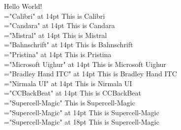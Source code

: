 \documentclass[UTF8]{article}
\begin{document}
Hello World!\\
\font\rm="Calibri" at 14pt \rm This is Calibri\\
\font\rm="Candara" at 14pt \rm This is Candara\\
\font\rm="Mistral" at 14pt \rm This is Mistral\\
\font\rm="Bahnschrift" at 14pt \rm This is Bahnschrift\\
\font\rm="Pristina" at 14pt \rm This is Pristina\\
\font\rm="Microsoft Uighur" at 14pt \rm This is Microsoft Uighur\\
\font\rm="Bradley Hand ITC" at 14pt \rm This is Bradley Hand ITC\\
\font\rm="Nirmala UI" at 14pt \rm This is Nirmala UI\\
\font\rm="CCBackBeat" at 14pt \rm This is CCBackBeat\\
\font\rm="Supercell-Magic" \rm This is Supercell-Magic\\
\font\rm="Supercell-Magic" at 14pt \rm This is Supercell-Magic\\
\font\rm="Supercell-Magic" at 18pt \rm This is Supercell-Magic\\
\end{document}
